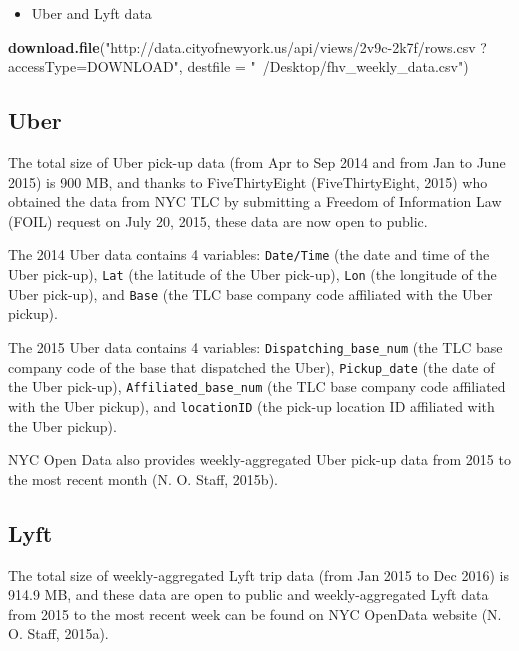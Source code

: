 \documentclass[12pt,twoside]{reedthesis}
\newenvironment{Shaded}{\begin{snugshade}}{\end{snugshade}}
\newcommand{\KeywordTok}[1]{\textcolor[rgb]{0.13,0.29,0.53}{\textbf{#1}}}
\newcommand{\DataTypeTok}[1]{\textcolor[rgb]{0.13,0.29,0.53}{#1}}
\newcommand{\StringTok}[1]{\textcolor[rgb]{0.31,0.60,0.02}{#1}}
\newcommand{\NormalTok}[1]{#1}
\providecommand{\tightlist}{%
  \setlength{\itemsep}{0pt}\setlength{\parskip}{0pt}}
\theoremstyle{definition}
\theoremstyle{definition}
\theoremstyle{definition}
\theoremstyle{remark}
\begin{document}
\begin{itemize}
\tightlist
\item
  Uber and Lyft data
\end{itemize}
\begin{Shaded}
\begin{Highlighting}[]
\KeywordTok{download.file}\NormalTok{(}\StringTok{"http://data.cityofnewyork.us/api/views/2v9c-2k7f/rows.csv}
\StringTok{              ?accessType=DOWNLOAD"}\NormalTok{, }
              \DataTypeTok{destfile =} \StringTok{"~/Desktop/fhv_weekly_data.csv"}\NormalTok{)}
\end{Highlighting}
\end{Shaded}
\subsection{Uber}\label{uber-1}

The total size of Uber pick-up data (from Apr to Sep 2014 and from Jan
to June 2015) is 900 MB, and thanks to FiveThirtyEight (FiveThirtyEight,
2015) who obtained the data from NYC TLC by submitting a Freedom of
Information Law (FOIL) request on July 20, 2015, these data are now open
to public.

The 2014 Uber data contains 4 variables: \texttt{Date/Time} (the date
and time of the Uber pick-up), \texttt{Lat} (the latitude of the Uber
pick-up), \texttt{Lon} (the longitude of the Uber pick-up), and
\texttt{Base} (the TLC base company code affiliated with the Uber
pickup).

The 2015 Uber data contains 4 variables: \texttt{Dispatching\_base\_num}
(the TLC base company code of the base that dispatched the Uber),
\texttt{Pickup\_date} (the date of the Uber pick-up),
\texttt{Affiliated\_base\_num} (the TLC base company code affiliated
with the Uber pickup), and \texttt{locationID} (the pick-up location ID
affiliated with the Uber pickup).

NYC Open Data also provides weekly-aggregated Uber pick-up data from
2015 to the most recent month (N. O. Staff, 2015b).

\subsection{Lyft}\label{lyft-1}

The total size of weekly-aggregated Lyft trip data (from Jan 2015 to Dec
2016) is 914.9 MB, and these data are open to public and
weekly-aggregated Lyft data from 2015 to the most recent week can be
found on NYC OpenData website (N. O. Staff, 2015a).
\end{document}
